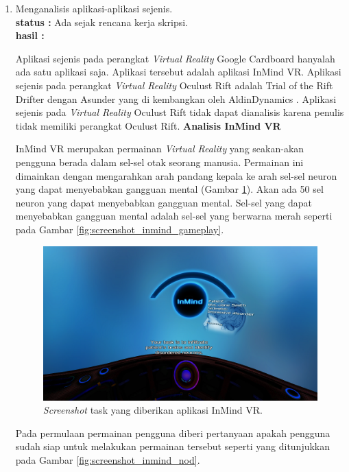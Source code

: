 \documentclass[a4paper,twoside]{article}
\begin{document}
\begin{enumerate}
		\item Menganalisis aplikasi-aplikasi sejenis.\\
		{\bf status :} Ada sejak rencana kerja skripsi.\\
		{\bf hasil :}



Aplikasi sejenis pada perangkat \textit{Virtual Reality} Google Cardboard hanyalah ada satu aplikasi saja. Aplikasi tersebut adalah aplikasi InMind VR. Aplikasi sejenis pada perangkat \textit{Virtual Reality} Oculust Rift adalah Trial of the Rift Drifter dengan Asunder yang di kembangkan oleh AldinDynamics \cite{aldin_dynamics}. Aplikasi sejenis pada \textit{Virtual Reality} Oculust Rift tidak dapat dianalisis karena penulis tidak memiliki perangkat Oculust Rift. 
\textbf{Analisis InMind VR}

InMind VR merupakan permainan \textit{Virtual Reality} yang seakan-akan pengguna berada dalam sel-sel otak seorang manusia. Permainan ini dimainkan dengan mengarahkan arah pandang kepala ke arah sel-sel neuron yang dapat menyebabkan gangguan mental (Gambar \ref{fig:screenshot_inmind_task}). Akan ada 50 sel neuron yang dapat menyebabkan gangguan mental. Sel-sel yang dapat menyebabkan gangguan mental adalah sel-sel yang berwarna merah seperti pada Gambar \ref{fig:screenshot_inmind_gameplay}.

\begin{figure}[H]
\centering
\includegraphics[scale=0.6]{Gambar/screenshot-inmind-task.png}
\caption{\textit{Screenshot} task yang diberikan aplikasi InMind VR.}
\label{fig:screenshot_inmind_task}
\end{figure}

Pada permulaan permainan pengguna diberi pertanyaan apakah pengguna sudah siap untuk melakukan permainan tersebut seperti yang ditunjukkan pada Gambar \ref{fig:screenshot_inmind_nod}.


\end{enumerate}
\end{document}
